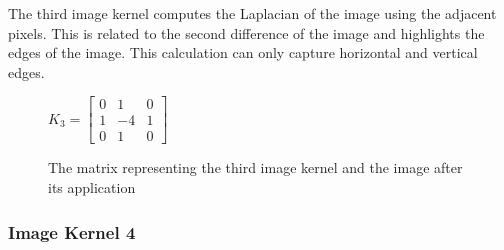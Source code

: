\documentclass[12pt,letterpaper]{article}
\begin{document}
The third image kernel computes the Laplacian of the image using the adjacent pixels. This is related to the second difference of the image and highlights the edges of the image. This calculation can only capture horizontal and vertical edges.
\begin{figure}[ht]
\centering
$K_3 = \begin{bmatrix}
0 & 1 & 0\\
1 & -4 & 1\\
0 & 1 & 0
\end{bmatrix}$
\hspace{2cm} 
\caption{\small{The matrix representing the third image kernel and the image after its application}
\label{fig:ker3} }
\end{figure}

\clearpage 
\newpage


\subsubsection{Image Kernel 4}
\end{document}
